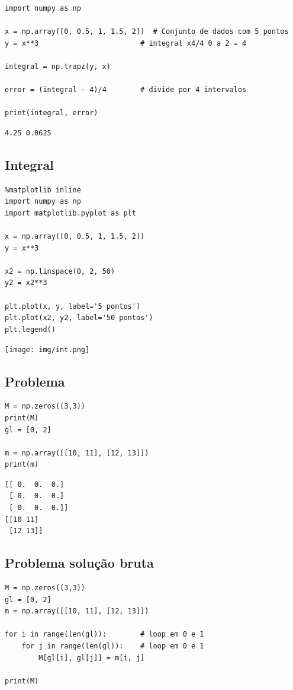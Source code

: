 \documentclass[presentation]{beamer}
\begin{document}
\begin{verbatim}
import numpy as np

x = np.array([0, 0.5, 1, 1.5, 2])  # Conjunto de dados com 5 pontos
y = x**3                        # integral x4/4 0 a 2 = 4

integral = np.trapz(y, x)

error = (integral - 4)/4        # divide por 4 intervalos

print(integral, error)
\end{verbatim}

\begin{verbatim}
4.25 0.0625
\end{verbatim}
\subsection{Integral}
\label{sec:orgheadline22}

\begin{verbatim}
%matplotlib inline
import numpy as np
import matplotlib.pyplot as plt

x = np.array([0, 0.5, 1, 1.5, 2])
y = x**3

x2 = np.linspace(0, 2, 50)
y2 = x2**3

plt.plot(x, y, label='5 pontos')
plt.plot(x2, y2, label='50 pontos')
plt.legend()
\end{verbatim}

\texttt{[image: img/int.png]}
\subsection{Problema}
\label{sec:orgheadline23}

\begin{verbatim}
M = np.zeros((3,3))
print(M)
gl = [0, 2]

m = np.array([[10, 11], [12, 13]])
print(m)
\end{verbatim}

\begin{verbatim}
[[ 0.  0.  0.]
 [ 0.  0.  0.]
 [ 0.  0.  0.]]
[[10 11]
 [12 13]]
\end{verbatim}
\subsection{Problema solução bruta}
\label{sec:orgheadline24}

\begin{verbatim}
M = np.zeros((3,3))
gl = [0, 2]
m = np.array([[10, 11], [12, 13]])

for i in range(len(gl)):        # loop em 0 e 1
    for j in range(len(gl)):    # loop em 0 e 1
        M[gl[i], gl[j]] = m[i, j]

print(M)
\end{verbatim}
\end{document}
